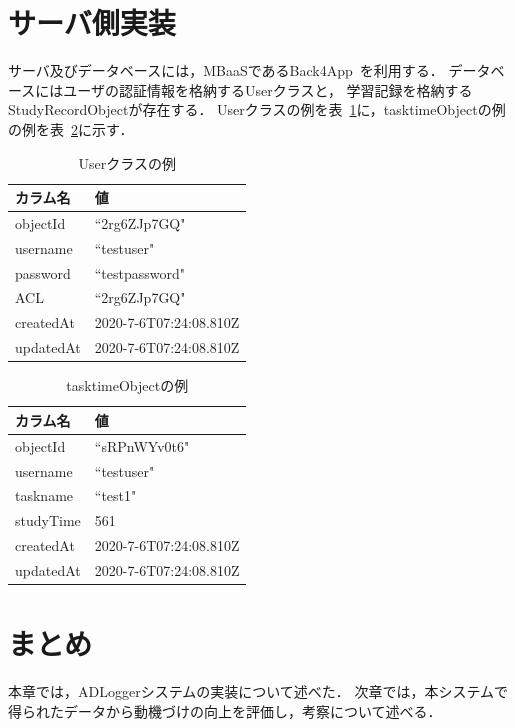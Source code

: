 \section{サーバ側実装}
サーバ及びデータベースには，MBaaSであるBack4App~\cite{back4app}を利用する．
データベースにはユーザの認証情報を格納するUserクラスと， 学習記録を格納するStudyRecordObjectが存在する．
Userクラスの例を表~\ref{tb:user_class}に，tasktimeObjectの例の例を表~\ref{tb:tasktime_object}に示す．

\begin{table}[htb]
\begin{center}
  \begin{tabular}{|l|l|} \hline
    カラム名 & 値 \\ \hline
    objectId & ``2rg6ZJp7GQ" \\
    username & ``testuser" \\
    password & ``testpassword" \\
    ACL & ``2rg6ZJp7GQ" \\
	createdAt & 2020-7-6T07:24:08.810Z  \\
	updatedAt & 2020-7-6T07:24:08.810Z \\ \hline
  \end{tabular}
  \caption{Userクラスの例}
  \label{tb:user_class}
\end{center}
\end{table}

\begin{table}[htb]
\begin{center}
  \begin{tabular}{|l|l|} \hline
    カラム名 & 値 \\ \hline
    objectId & ``sRPnWYv0t6" \\
    username & ``testuser" \\
    taskname & ``test1" \\
    studyTime & 561 \\ 
    createdAt & 2020-7-6T07:24:08.810Z  \\
    updatedAt & 2020-7-6T07:24:08.810Z \\ \hline
  \end{tabular}
  \caption{tasktimeObjectの例}
  \label{tb:tasktime_object}
\end{center}
\end{table}

\section{まとめ}
本章では，ADLoggerシステムの実装について述べた．
次章では，本システムで得られたデータから動機づけの向上を評価し，考察について述べる．
